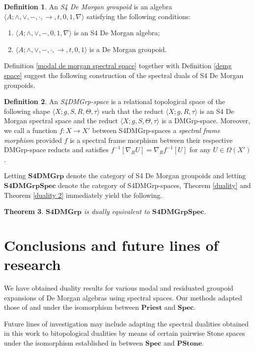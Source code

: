 \documentclass{amsart}
\theoremstyle{plain}
\newtheorem{theorem}{Theorem}[section]
\theoremstyle{definition}
\newtheorem{definition}[theorem]{Definition}
\begin{document}
\begin{definition}
    An \emph{S4 De Morgan groupoid} is an algebra $\langle A;\wedge,\vee,-,\cdot,\rightarrow,t,0,1,\nabla\rangle$ satisfying the following conditions: 
    \begin{enumerate}
        \item $\langle A;\wedge,\vee,-,0,1,\nabla\rangle$ is an S4 De Morgan algebra; 
        \item $\langle A;\wedge,\vee,-,\cdot,\rightarrow,t,0,1\rangle$ is a De Morgan groupoid. 
    \end{enumerate}
\end{definition}
Definition \ref{modal de morgan spectral space} together with Definition \ref{demg space} suggest the following construction of the spectral duals of S4 De Morgan groupoids. 
\begin{definition}
       An \emph{S4DMGrp-space} is a relational topological space of the following shape $\langle X;g,S,R,\Theta,\tau\rangle$ such that the reduct $\langle X;g,R,\tau\rangle$ is an S4 De Morgan spectral space and the reduct $\langle X;g,S,\Theta,\tau\rangle$ is a DMGrp-space. Moreover, we call a function $f\colon X\to X'$ between S4DMGrp-spaces a \emph{spectral frame morphism} provided $f$ is a spectral frame morphism between their respective DMGrp-space reducts and satisfies $f^{-1}[\nabla_RU]=\nabla_Rf^{-1}[U]$ for any $U\in\Omega(X')$.  
\end{definition}
Letting $\mathbf{S4DMGrp}$ denote the category of S4 De Morgan groupoids and letting $\mathbf{S4DMGrpSpec}$ denote the category of S4DMGrp-spaces, Theorem \ref{duality} and Theorem \ref{duality 2} immediately yield the following.   
\begin{theorem}
    $\mathbf{S4DMGrp}$ is dually equivalent to $\mathbf{S4DMGrpSpec}$. 
\end{theorem}

\section{Conclusions and future lines of research}
We have obtained duality results for various modal and residuated groupoid expansions of De Morgan algebras using spectral spaces. Our methods adapted those of \cite{bimbo} and \cite{urq} under the isomorphism between $\mathbf{Priest}$ and $\mathbf{Spec}$.   



Future lines of investigation may include adapting the spectral dualities obtained in this work to bitopological dualities by means of certain pairwise Stone spaces under the isomorphism established in \cite{bezhanishvili} between $\mathbf{Spec}$ and $\mathbf{PStone}$.  
\end{document}
